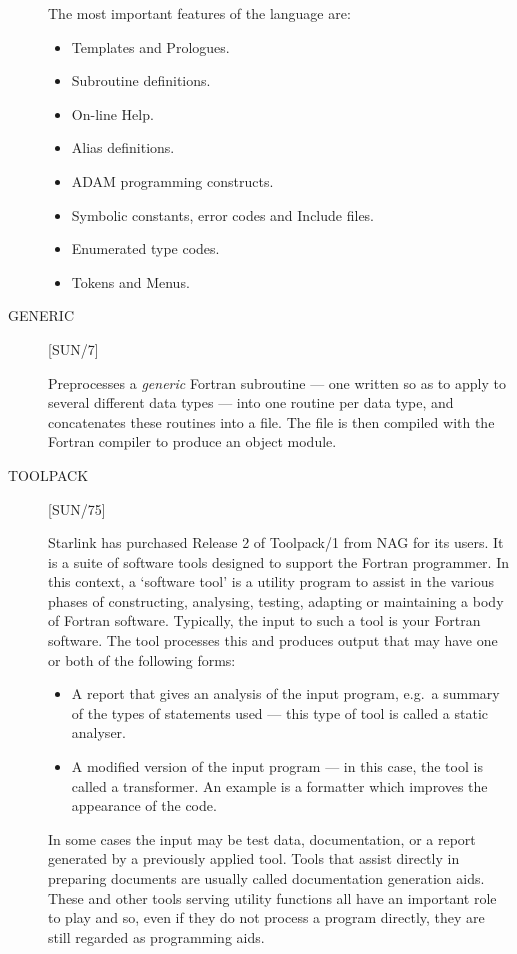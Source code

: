 \begin{description}
The most important features of the language are:
\begin{itemize}
\item Templates and Prologues.
\item Subroutine definitions.
\item On-line Help.
\item Alias definitions.
\item ADAM programming constructs.
\item Symbolic constants, error codes and Include files.
\item Enumerated type codes.
\item Tokens and Menus.
\end{itemize}

\item [GENERIC] \hfill [SUN/7]

Preprocesses a {\it generic} Fortran subroutine --- one written so as to apply
to several different data types --- into one routine per data type, and
concatenates these routines into a file.
The file is then compiled with the Fortran compiler to produce an
object module.

\item [TOOLPACK] \hfill [SUN/75]

Starlink has purchased Release 2 of Toolpack/1 from NAG for its users.
It is a suite of software tools designed to support the Fortran programmer.
In this context, a `software tool' is a utility program to assist in the
various phases of constructing, analysing, testing, adapting or maintaining
a body of Fortran software.
Typically, the input to such a tool is your Fortran software.
The tool processes this and produces output that may have one or both of the
following forms:
\begin{itemize}
\item A report that gives an analysis of the input program, e.g.\ a summary of
the types of statements used --- this type of tool is called a static analyser.
\item A modified version of the input program --- in this case, the tool is
called a transformer.
An example is a formatter which improves the appearance of the code.
\end{itemize}
In some cases the input may be test data, documentation, or a report generated
by a previously applied tool.
Tools that assist directly in preparing documents are usually called
documentation generation aids.
These and other tools serving utility functions all have an important role
to play and so, even if they do not process a program directly, they are
still regarded as programming aids.


\end{description}
